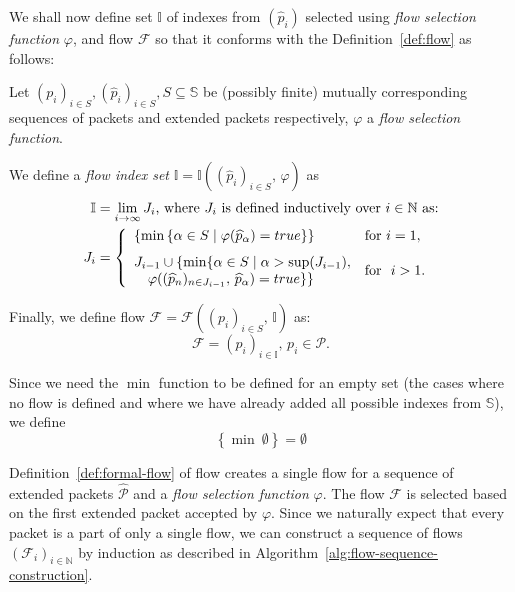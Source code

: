 We shall now define set $\mathbb{I}$ of indexes from $(\widehat{p}_i)$ selected using \emph{flow selection function} $\varphi$, and flow $\mathcal{F}$ so that it conforms with the Definition~\ref{def:flow} as follows:
\begin{defn}\label{def:formal-flow}
Let $(p_i)_{i \in S}, (\widehat{p}_i)_{i \in S}, S \subseteq \mathbb{S}$ be (possibly finite) mutually corresponding sequences of packets and extended packets respectively, $\varphi$ a \emph{flow selection function}.

We define a \emph{flow index set} $\mathbb{I} = \mathbb{I}\left((\widehat{p}_i)_{i \in S},\, \varphi\right)$ as 
\begin{align*}
\mathbb{I} &= \lim_{i \to \infty} J_i \text{, where } J_i \text{ is defined inductively over }i \in \mathbb{N} \text{ as:} \notag\\
J_i &= \left\{
    \begin{array}{ll}
        \left\{\min\left\{ \alpha \in S \mid \varphi(\widehat{p}_{\alpha}) = true \right\}\right\} & \text{for } i = 1 , \\[0.7em]
        J_{i-1} \cup \{\min\{ \alpha \in S \mid \alpha > \sup(J_{i-1}), & \multirow{2}{*}{\text{for } $i > 1$.} \\
        \quad \varphi((\widehat{p}_n)_{n\in J_{i-1}},\, \widehat{p}_{\alpha}) = true \}\} &
    \end{array}\right.
\end{align*}

Finally, we define flow $\mathcal{F} = \mathcal{F}\left((p_i)_{i \in S},\, \mathbb{I}\right)$ as:
\begin{equation*}
    \mathcal{F} = (p_i)_{i \in \mathbb{I}},\, p_i \in \mathcal{P}.
\end{equation*}

\end{defn}

Since we need the $\min$ function to be defined for an empty set (the cases where no flow is defined and where we have already added all possible indexes from $\mathbb{S}$), we define
\begin{equation*}
    \left\{\min\ \emptyset \right\} = \emptyset
\end{equation*}

Definition~\ref{def:formal-flow} of flow creates a single flow for a sequence of extended packets $\widehat{\mathcal{P}}$ and a \emph{flow selection function} $\varphi$. The flow $\mathcal{F}$ is selected based on the first extended packet accepted by $\varphi$. Since we naturally expect that every packet is a part of only a single flow, we can construct a sequence of flows $(\mathcal{F}_i)_{i \in \mathbb{N}}$ by induction as described in Algorithm~\ref{alg:flow-sequence-construction}.

